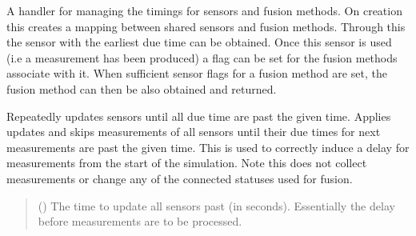 \documentclass[letterpaper,10pt,english]{sphinxmanual}
\begin{document}
\begin{fulllineitems}
\label{\detokenize{modules/simulation/scheduling:qnav.simulation.scheduling.TimingHandler}}
\pysigstartsignatures
{}
\pysigstopsignatures
\sphinxAtStartPar
A handler for managing the timings for sensors and fusion methods.
On creation this creates a mapping between shared sensors and fusion
methods. Through this the sensor with the earliest due time can be
obtained. Once this sensor is used (i.e a measurement has been produced)
a flag can be set for the fusion methods associate with it. When
sufficient sensor flags for a fusion method are set, the fusion method
can then be also obtained and returned.

\begin{fulllineitems}
\label{\detokenize{modules/simulation/scheduling:qnav.simulation.scheduling.TimingHandler.update_sensors_past_time}}
\pysigstartsignatures
{}
\pysigstopsignatures
\sphinxAtStartPar
Repeatedly updates sensors until all due time are past the given time.
Applies updates and skips measurements of all sensors until their due
times for next measurements are past the given time. This is used to
correctly induce a delay for measurements from the start of the
simulation. Note this does not collect measurements or change any
of the connected statuses used for fusion.
\begin{quote}\begin{description}
\sphinxAtStartPar
{} () \textendash{} The time to update all sensors past (in seconds).
Essentially the delay before measurements are to be processed.

\end{description}\end{quote}


\end{fulllineitems}
\end{fulllineitems}
\end{document}
